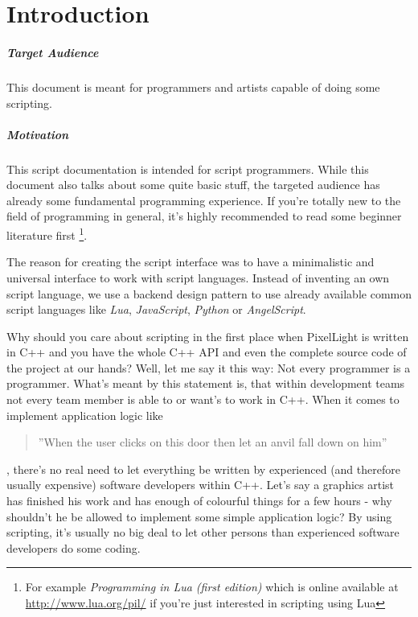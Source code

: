 \chapter{Introduction}


\paragraph{Target Audience}
This document is meant for programmers and artists capable of doing some scripting.


\paragraph{Motivation}
This script documentation is intended for script programmers. While this document also talks about some quite basic stuff, the targeted audience has already some fundamental programming experience. If you're totally new to the field of programming in general, it's highly recommended to read some beginner literature first \footnote{For example \emph{Programming in Lua (first edition)} which is online available at \url{http://www.lua.org/pil/} if you're just interested in scripting using Lua}.

The reason for creating the script interface was to have a minimalistic and universal interface to work with script languages. Instead of inventing an own script language, we use a backend design pattern to use already available common script languages like \emph{Lua}, \emph{JavaScript}, \emph{Python} or \emph{AngelScript}.

Why should you care about scripting in the first place when PixelLight is written in C++ and you have the whole C++ API and even the complete source code of the project at our hands? Well, let me say it this way: Not every programmer is a programmer. What's meant by this statement is, that within development teams not every team member is able to or want's to work in C++. When it comes to implement application logic like \begin{quote}''When the user clicks on this door then let an anvil fall down on him''\end{quote}, there's no real need to let everything be written by experienced (and therefore usually expensive) software developers within C++. Let's say a graphics artist has finished his work and has enough of colourful things for a few hours - why shouldn't he be allowed to implement some simple application logic? By using scripting, it's usually no big deal to let other persons than experienced software developers do some coding.

